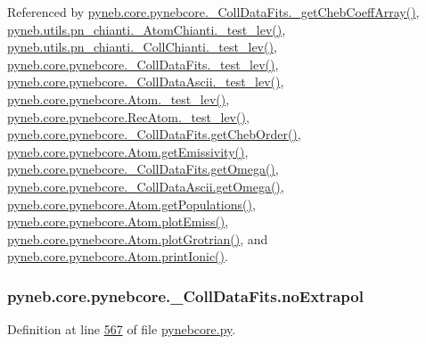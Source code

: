 Referenced by \hyperlink{pynebcore_8py_source_l00734}{pyneb.\+core.\+pynebcore.\+\_\+\+Coll\+Data\+Fits.\+\_\+get\+Cheb\+Coeff\+Array()}, \hyperlink{pn__chianti_8py_source_l00284}{pyneb.\+utils.\+pn\+\_\+chianti.\+\_\+\+Atom\+Chianti.\+\_\+test\+\_\+lev()}, \hyperlink{pn__chianti_8py_source_l00449}{pyneb.\+utils.\+pn\+\_\+chianti.\+\_\+\+Coll\+Chianti.\+\_\+test\+\_\+lev()}, \hyperlink{pynebcore_8py_source_l00660}{pyneb.\+core.\+pynebcore.\+\_\+\+Coll\+Data\+Fits.\+\_\+test\+\_\+lev()}, \hyperlink{pynebcore_8py_source_l01026}{pyneb.\+core.\+pynebcore.\+\_\+\+Coll\+Data\+Ascii.\+\_\+test\+\_\+lev()}, \hyperlink{pynebcore_8py_source_l01459}{pyneb.\+core.\+pynebcore.\+Atom.\+\_\+test\+\_\+lev()}, \hyperlink{pynebcore_8py_source_l02596}{pyneb.\+core.\+pynebcore.\+Rec\+Atom.\+\_\+test\+\_\+lev()}, \hyperlink{pynebcore_8py_source_l00694}{pyneb.\+core.\+pynebcore.\+\_\+\+Coll\+Data\+Fits.\+get\+Cheb\+Order()}, \hyperlink{pynebcore_8py_source_l01716}{pyneb.\+core.\+pynebcore.\+Atom.\+get\+Emissivity()}, \hyperlink{pynebcore_8py_source_l00811}{pyneb.\+core.\+pynebcore.\+\_\+\+Coll\+Data\+Fits.\+get\+Omega()}, \hyperlink{pynebcore_8py_source_l01063}{pyneb.\+core.\+pynebcore.\+\_\+\+Coll\+Data\+Ascii.\+get\+Omega()}, \hyperlink{pynebcore_8py_source_l01496}{pyneb.\+core.\+pynebcore.\+Atom.\+get\+Populations()}, \hyperlink{pynebcore_8py_source_l02313}{pyneb.\+core.\+pynebcore.\+Atom.\+plot\+Emiss()}, \hyperlink{pynebcore_8py_source_l02372}{pyneb.\+core.\+pynebcore.\+Atom.\+plot\+Grotrian()}, and \hyperlink{pynebcore_8py_source_l02167}{pyneb.\+core.\+pynebcore.\+Atom.\+print\+Ionic()}.

\hypertarget{classpyneb_1_1core_1_1pynebcore_1_1___coll_data_fits_a97b30abb66948d40dc2077a3c3b15231}{}
\subsubsection[{no\+Extrapol}]{\setlength{\rightskip}{0pt plus 5cm}pyneb.\+core.\+pynebcore.\+\_\+\+Coll\+Data\+Fits.\+no\+Extrapol}\label{classpyneb_1_1core_1_1pynebcore_1_1___coll_data_fits_a97b30abb66948d40dc2077a3c3b15231}


Definition at line \hyperlink{pynebcore_8py_source_l00567}{567} of file \hyperlink{pynebcore_8py_source}{pynebcore.\+py}.



